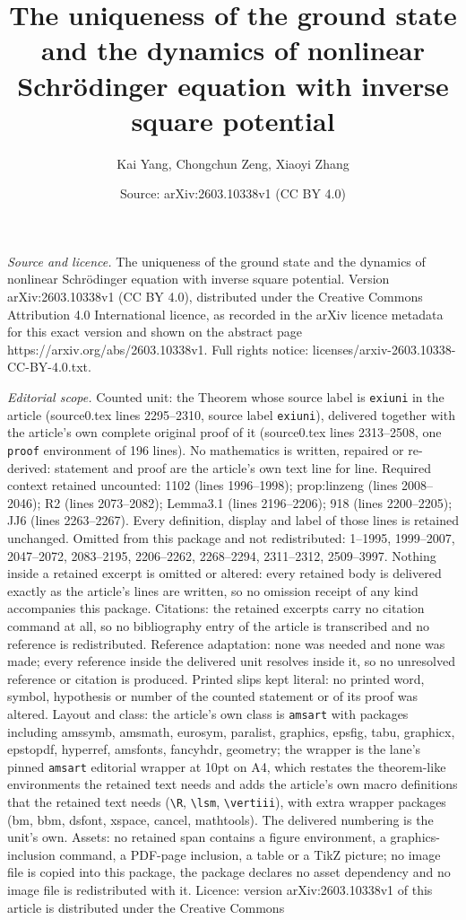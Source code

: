 \documentclass[10pt,a4paper]{amsart}
\title[The uniqueness of the ground state and the dynamics of nonli]{The uniqueness of the ground state and the dynamics of nonlinear Schr\"odinger equation with inverse square potential}
\author{Kai Yang, Chongchun Zeng, Xiaoyi Zhang}
\date{Source: arXiv:2603.10338v1 (CC BY 4.0)}
\begin{document}
\maketitle

\noindent\emph{Source and licence.} The uniqueness of the ground state and the dynamics of nonlinear Schr\"odinger equation with inverse square potential. Version arXiv:2603.10338v1 (CC BY 4.0), distributed under the Creative Commons Attribution 4.0 International licence, as recorded in the arXiv licence metadata for this exact version and shown on the abstract page https://arxiv.org/abs/2603.10338v1. Full rights notice: licenses/arxiv-2603.10338-CC-BY-4.0.txt.\par\smallskip

\noindent\textit{Editorial scope.} Counted unit: the Theorem whose source label is \texttt{exiuni} in the article (source0.tex lines 2295--2310, source label \texttt{exiuni}), delivered together with the article's own complete original proof of it (source0.tex lines 2313--2508, one \texttt{proof} environment of 196 lines). No mathematics is written, repaired or re-derived: statement and proof are the article's own text line for line. Required context retained uncounted: 1102 (lines 1996--1998); prop:linzeng (lines 2008--2046); R2 (lines 2073--2082); Lemma3.1 (lines 2196--2206); 918 (lines 2200--2205); JJ6 (lines 2263--2267). Every definition, display and label of those lines is retained unchanged. Omitted from this package and not redistributed: 1--1995, 1999--2007, 2047--2072, 2083--2195, 2206--2262, 2268--2294, 2311--2312, 2509--3997. Nothing inside a retained excerpt is omitted or altered: every retained body is delivered exactly as the article's lines are written, so no omission receipt of any kind accompanies this package. Citations: the retained excerpts carry no citation command at all, so no bibliography entry of the article is transcribed and no reference is redistributed. Reference adaptation: none was needed and none was made; every reference inside the delivered unit resolves inside it, so no unresolved reference or citation is produced. Printed slips kept literal: no printed word, symbol, hypothesis or number of the counted statement or of its proof was altered. Layout and class: the article's own class is \texttt{amsart} with packages including amssymb, amsmath, eurosym, paralist, graphics, epsfig, tabu, graphicx, epstopdf, hyperref, amsfonts, fancyhdr, geometry; the wrapper is the lane's pinned \texttt{amsart} editorial wrapper at 10pt on A4, which restates the theorem-like environments the retained text needs and adds the article's own macro definitions that the retained text needs (\texttt{\textbackslash R}, \texttt{\textbackslash lsm}, \texttt{\textbackslash vertiii}), with extra wrapper packages (bm, bbm, dsfont, xspace, cancel, mathtools). The delivered numbering is the unit's own. Assets: no retained span contains a figure environment, a graphics-inclusion command, a PDF-page inclusion, a table or a TikZ picture; no image file is copied into this package, the package declares no asset dependency and no image file is redistributed with it. Licence: version arXiv:2603.10338v1 of this article is distributed under the Creative Commons 
\end{document}
